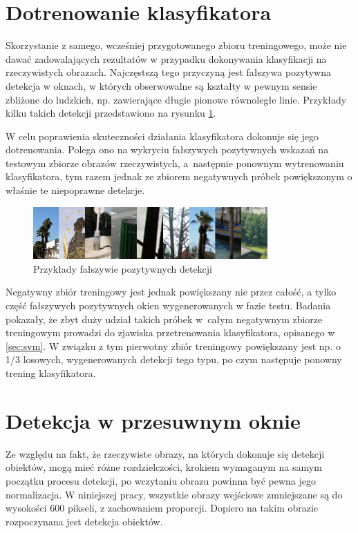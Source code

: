 \section{Dotrenowanie klasyfikatora}
\label{sec:dotrenowanie}

Skorzystanie z samego, wcześniej przygotowanego zbioru treningowego, może nie dawać zadowalających rezultatów w przypadku dokonywania klasyfikacji na rzeczywistych obrazach. Najczęstszą tego przyczyną jest fałszywa pozytywna detekcja w oknach, w których obserwowalne są kształty w pewnym sensie zbliżone do ludzkich, np. zawierające długie pionowe równoległe linie.
Przykłady kilku takich detekcji przedstawiono na rysunku \ref{fig:fp}.

W celu poprawienia skuteczności działania klasyfikatora dokonuje się jego dotrenowania. Polega ono na wykryciu fałszywych pozytywnych wskazań na testowym zbiorze obrazów rzeczywistych, a~następnie ponownym wytrenowaniu klasyfikatora, tym razem jednak ze zbiorem negatywnych próbek powiększonym o właśnie te niepoprawne detekcje.

\begin{figure}[htb]
\centering
\includegraphics[width=0.8\textwidth]{ch3_fp.png}
\caption{Przykłady fałszywie pozytywnych detekcji}
\label{fig:fp}
\end{figure}

Negatywny zbiór treningowy jest jednak powiększany nie przez całość, a tylko część fałszywych pozytywnych okien wygenerowanych w fazie testu. Badania pokazały, że zbyt duży udział takich próbek w~całym negatywnym zbiorze treningowym prowadzi do zjawiska przetrenowania klasyfikatora, opisanego w \ref{sec:svm}. W związku z tym pierwotny zbiór treningowy powiększany jest np. o 1/3 losowych, wygenerowanych detekcji tego typu, po czym następuje ponowny trening klasyfikatora.


\section{Detekcja w przesuwnym oknie}
\label{sec:okno}

Ze względu na fakt, że rzeczywiste obrazy, na których dokonuje się detekcji obiektów, mogą mieć różne rozdzielczości, krokiem wymaganym na samym początku procesu detekcji, po wczytaniu obrazu powinna być pewna jego normalizacja. W niniejszej pracy, wszystkie obrazy wejściowe zmniejszane są do wysokości 600 pikseli, z zachowaniem proporcji. Dopiero na takim obrazie rozpoczynana jest detekcja obiektów.

